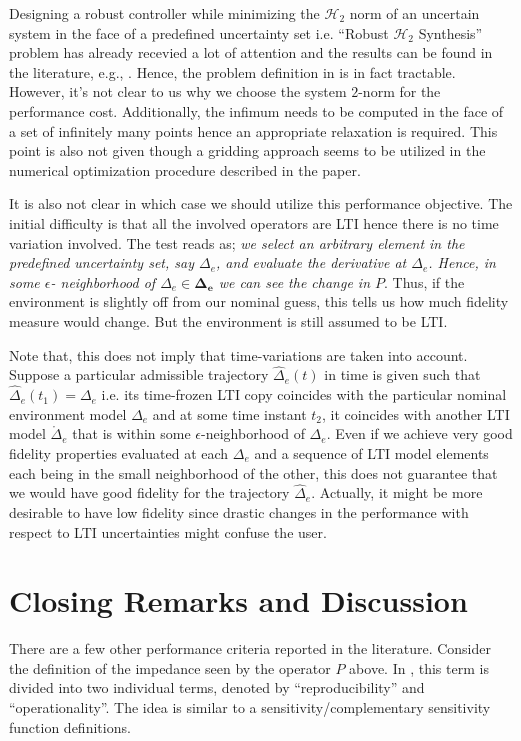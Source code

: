 Designing a robust controller while minimizing the $\mathcal{H}_2$ norm of an uncertain system in the face of a predefined 
uncertainty set i.e. \enquote{Robust $\mathcal{H}_2$ Synthesis} problem has already recevied a lot of attention and 
the results can be found in the literature, e.g., \cite{dullerud}. Hence, the problem definition in \cite{cavusoglu} is 
in fact tractable. However, it's not clear to us why we choose the system $2$-norm for the performance cost. Additionally, 
the infimum needs to be computed in the face of a set of infinitely many points hence an appropriate relaxation is required. 
This point is also not given though a gridding approach seems to be utilized in the numerical optimization procedure 
described in the paper.

It is also not clear in which case we should utilize this performance objective. The initial difficulty is that all the 
involved operators are LTI hence there is no time variation involved. The test reads as; \emph{we select an arbitrary element 
in the predefined uncertainty set, say $\Delta_e$, and evaluate the derivative at $\Delta_e$. Hence, in some $\epsilon$-
neighborhood of $\Delta_e\in\bm{\Delta_e}$ we can see the change in $P$}. Thus, if the environment is slightly off from our 
nominal guess, this tells us how much fidelity measure would change. But the environment is still assumed to be LTI.


Note that, this does not imply that time-variations are taken into account. Suppose a particular admissible trajectory
$\hat{\Delta}_e(t)$ in time is given such that $\hat{\Delta}_e(t_1)=\Delta_e$ i.e. its time-frozen LTI copy coincides 
with the particular nominal environment model $\Delta_e$ and at some time instant $t_2$, it  coincides with another 
LTI model $\mathring\Delta_e$ that is within some $\epsilon$-neighborhood of $\Delta_e$. Even if we achieve very good 
fidelity properties evaluated at each $\Delta_e$ and a sequence of LTI model elements each being in the small neighborhood 
of the other, this does not guarantee that we would have good fidelity for the trajectory $\hat{\Delta}_e$. Actually, 
it might be more desirable to have low fidelity since drastic changes in the performance with respect to LTI uncertainties
might confuse the user.


\section{Closing Remarks and Discussion}
There are a few other performance criteria reported in the literature. Consider the definition of the impedance seen by 
the operator $P$ above. In \cite{iida,katsura}, this term is divided into two individual terms, denoted by 
\enquote{reproducibility} and \enquote{operationality}. The idea is similar to a sensitivity/complementary sensitivity 
function definitions. 

